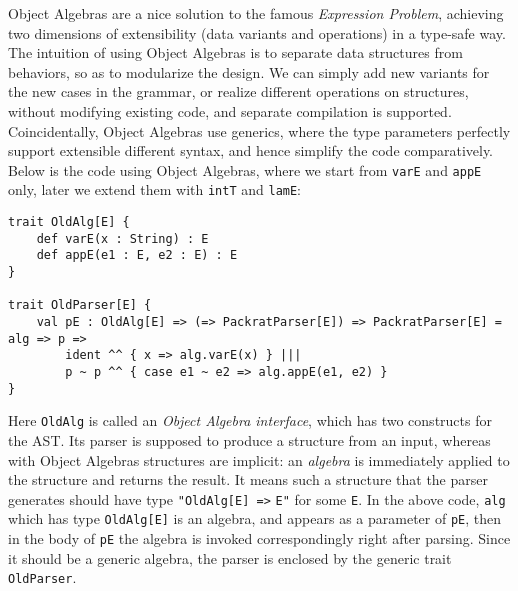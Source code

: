 Object Algebras are a nice solution to the famous \textit{Expression Problem}, achieving two dimensions of extensibility (data variants and operations)
in a type-safe way. The intuition of using Object Algebras is to separate data structures from behaviors, so as to modularize the design. We can simply add new variants for the new cases in the grammar, or realize different operations on structures, without modifying existing code, and separate compilation is supported. Coincidentally, Object Algebras use generics, where the type parameters perfectly support extensible different syntax, and hence simplify the code comparatively. Below is the code using Object Algebras, where we start from \lstinline{varE} and \lstinline{appE} only, later we extend them with \lstinline{intT} and \lstinline{lamE}:
\begin{lstlisting}
trait OldAlg[E] {
    def varE(x : String) : E
    def appE(e1 : E, e2 : E) : E
}

trait OldParser[E] {
    val pE : OldAlg[E] => (=> PackratParser[E]) => PackratParser[E] = alg => p =>
        ident ^^ { x => alg.varE(x) } |||
        p ~ p ^^ { case e1 ~ e2 => alg.appE(e1, e2) }
}
\end{lstlisting}
Here \lstinline{OldAlg} is called an \textit{Object Algebra interface}, which has two constructs for the AST. Its parser is
supposed to produce a structure from an input, whereas with Object Algebras structures are implicit: an \textit{algebra}
is immediately applied to the structure and returns the result. It means such a structure that the parser generates should have
type \lstinline{"OldAlg[E] =>} \lstinline{E"} for some \lstinline{E}. In the above code, \lstinline{alg} which has type
\lstinline{OldAlg[E]} is an algebra, and appears as a parameter of \lstinline{pE}, then in the body of \lstinline{pE} the algebra
is invoked correspondingly right after parsing. Since it should be a generic algebra, the parser is enclosed by the generic trait \lstinline{OldParser}.

